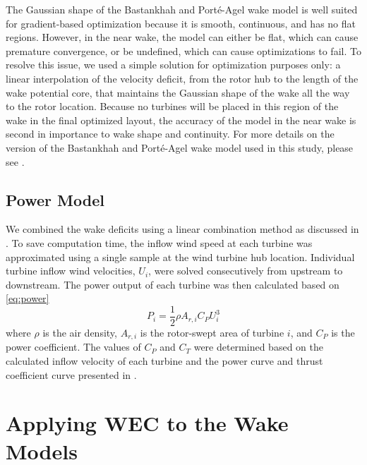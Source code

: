 \documentclass[a4paper]{jpconf}
\begin{document}
The Gaussian shape of the Bastankhah and Port\'e-Agel wake model is well suited for gradient-based optimization because it is smooth, continuous, and has no flat regions. However, in the near wake, the model can either be flat, which can cause premature convergence, or be undefined, which can cause optimizations to fail. To resolve this issue, we used a simple solution for optimization purposes only: a linear interpolation of the velocity deficit, from the rotor hub to the length of the wake potential core, that maintains the Gaussian shape of the wake all the way to the rotor location. Because no turbines will be placed in this region of the wake in the final optimized layout, the accuracy of the model in the near wake is second in importance to wake shape and continuity. For more details on the version of the Bastankhah and Port\'e-Agel wake model used in this study, please see \cite{thomas2019-les-validation}.

\subsection{Power Model}
We combined the wake deficits using a linear combination method as discussed in \cite{niayifar2016}. To save computation time, the inflow wind speed at each turbine was approximated using a single sample at the wind turbine hub location. Individual turbine inflow wind velocities, $U_i$, were solved consecutively from upstream to downstream. The power output of each turbine was then calculated based on \cref{eq:power}
%
\begin{equation}\label{eq:power}
P_i = \frac{1}{2}\rho A_{r,i}C_P U_i^3
\end{equation}
%
where $\rho$ is the air density, $A_{r,i}$ is the rotor-swept area of turbine $i$, and $C_P$ is the power coefficient. The values of $C_P$ and $C_T$ were determined based on the calculated inflow velocity of each turbine and the power curve and thrust coefficient curve presented in \cite{niayifar2016}.

\section{Applying WEC to the  Wake Models}
\end{document}
